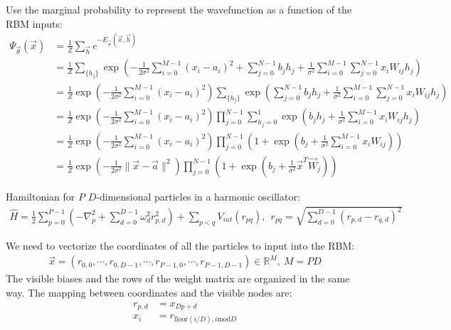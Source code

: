 \documentclass[12pt]{article}
\begin{document}
\noindent Use the marginal probability to represent the wavefunction as a function of the RBM inputs:
\begin{align*}
\Psi_{\vec{\theta}}(\vec{x}) &= \frac{1}{Z} \sum_{\vec{h}} e^{-E_{\vec{\theta}}(\vec{x},\vec{h})}\\
&= \frac{1}{Z} \sum_{ \{ h_j \} } \exp \left( -\frac{1}{2\sigma^2} \sum_{i=0}^{M-1}(x_i - a_i)^2 + \sum_{j=0}^{N-1} b_j h_j + \frac{1}{\sigma^2} \sum_{i=0}^{M-1}\sum_{j=0}^{N-1} x_i W_{ij} h_j  \right)\\
&=\frac{1}{Z} \exp \left( -\frac{1}{2\sigma^2} \sum_{i=0}^{M-1}(x_i - a_i)^2 \right) \sum_{ \{ h_j \} } \exp \left( \sum_{j=0}^{N-1} b_j h_j + \frac{1}{\sigma^2} \sum_{i=0}^{M-1}\sum_{j=0}^{N-1} x_i W_{ij} h_j  \right)\\
&=\frac{1}{Z} \exp \left( -\frac{1}{2\sigma^2} \sum_{i=0}^{M-1}(x_i - a_i)^2 \right) \prod_{j=0}^{N-1} \sum_{ h_j=0 }^1 \exp \left( b_j h_j + \frac{1}{\sigma^2} \sum_{i=0}^{M-1} x_i W_{ij} h_j  \right)\\
&=\frac{1}{Z} \exp \left( -\frac{1}{2\sigma^2} \sum_{i=0}^{M-1}(x_i - a_i)^2 \right) \prod_{j=0}^{N-1} \left( 1 + \exp \left( b_j + \frac{1}{\sigma^2} \sum_{i=0}^{M-1} x_i W_{ij} \right) \right)\\
&= \frac{1}{Z} \exp \left( -\frac{1}{2\sigma^2} \| \vec{x}-\vec{a} \|^2 \right) \prod_{j=0}^{N-1} \left( 1 + \exp \left( b_j + \frac{1}{\sigma^2} \vec{x}^T \vec{W}_j \right) \right)
\end{align*}

\noindent Hamiltonian for $P$ $D$-dimensional particles in a harmonic oscillator:
\begin{align*}
\hat{H} = \frac{1}{2} \sum_{p = 0}^{P-1} \left( -\nabla_p^2 + \sum_{d=0}^{D-1} \omega_d^2 r_{p,d}^2 \right) + \sum_{p<q} V_{int} (r_{pq}), \ \ r_{pq} = \sqrt{ \sum_{d=0}^{D-1} (r_{p,d}-r_{q,d})^2 } 
\end{align*}




\noindent We need to vectorize the coordinates of all the particles to input into the RBM:
\begin{align*}
\vec{x} = ( r_{0,0}, \cdots, r_{0,D-1}, \cdots, r_{P-1,0}, \cdots, r_{P-1,D-1} ) \in \mathbb{R}^M, \ M = PD
\end{align*}
\noindent The visible biases and the rows of the weight matrix are organized in the same way. The mapping between coordinates and the visible nodes are:
\begin{align*}
r_{p,d} &= x_{Dp+d}\\
x_i &= r_{\text{floor}(i/D), i \text{mod} D}
\end{align*}
\end{document}
